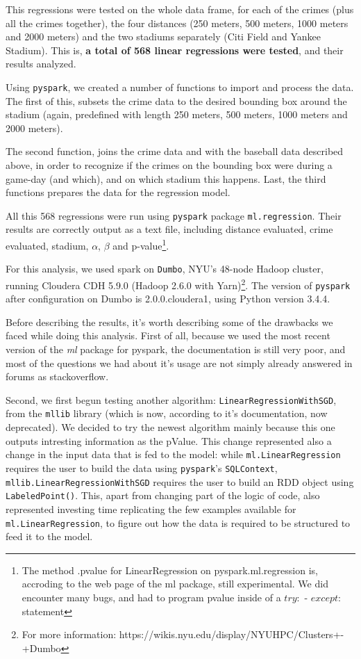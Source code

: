 \documentclass{article}
\begin{document}
This regressions were tested on the whole data frame, for each of the crimes (plus all the crimes together), the four distances (250 meters, 500 meters, 1000 meters and 2000 meters) and the two stadiums separately (Citi Field and Yankee Stadium). This is, \textbf{a total of 568 linear regressions were tested}, and their results analyzed. 

Using \texttt{pyspark}, we created a number of functions to import and process the data. The first of this, subsets the crime data to the desired bounding box around the stadium (again, predefined with length 250 meters, 500 meters, 1000 meters and 2000 meters). 

The second function, joins the crime data and with the baseball data described above, in order to recognize if the crimes on the bounding box were during a game-day (and which), and on which stadium this happens. Last, the third functions prepares the data for the regression model. 

All this 568 regressions were run using \texttt{pyspark} package \texttt{ml.regression}. Their results are correctly output as a text file, including distance evaluated, crime evaluated, stadium,  $\alpha$, $\beta$ and p-value\footnote{The method .pvalue for LinearRegression on pyspark.ml.regression is, accroding to the web page of the ml package, still experimental. We did encounter many bugs, and had to program pvalue inside of a $try:$ - $except:$ statement}. 

For this analysis, we used spark on \texttt{Dumbo}, NYU's 48-node Hadoop cluster, running Cloudera CDH 5.9.0 (Hadoop 2.6.0 with Yarn)\footnote{For more information: https://wikis.nyu.edu/display/NYUHPC/Clusters+-+Dumbo}. The version of \texttt{pyspark} after configuration on Dumbo is  2.0.0.cloudera1, using Python version 3.4.4. 

Before describing the results, it's worth describing some of the drawbacks we faced while doing this analysis. First of all, because we used the most recent version of the \textit{ml} package for pyspark, the documentation is still very poor, and most of the questions we had about it's usage are not simply already answered in forums as stackoverflow. 

Second, we first begun testing another algorithm: \texttt{LinearRegressionWithSGD}, from the \texttt{mllib} library (which is now, according to it's documentation, now deprecated). We decided to try the newest algorithm mainly because this one outputs intresting information as the pValue. This change represented also a change in the input data that is fed to the model: while \texttt{ml.LinearRegression} requires the user to build the data using \texttt{pyspark}'s \texttt{SQLContext}, \texttt{mllib.LinearRegressionWithSGD} requires the user to build an RDD object using \texttt{LabeledPoint()}. This, apart from changing part of the logic of code, also represented investing time replicating the few examples available for \texttt{ml.LinearRegression}, to figure out how the data is required to be structured to feed it to the model. 
\end{document}

